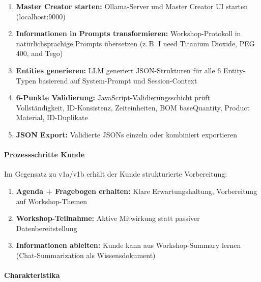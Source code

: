\begin{enumerate}
    \item \textbf{Master Creator starten:} Ollama-Server und Master Creator UI starten (localhost:9000)

    \item \textbf{Informationen in Prompts transformieren:} Workshop-Protokoll in natürlichsprachige Prompts übersetzen (z.\,B. \glqq I need Titanium Dioxide, PEG 400, and Tego\grqq{})

    \item \textbf{Entities generieren:} LLM generiert JSON-Strukturen für alle 6 Entity-Typen basierend auf System-Prompt und Session-Context

    \item \textbf{6-Punkte Validierung:} JavaScript-Validierungsschicht prüft Vollständigkeit, ID-Konsistenz, Zeiteinheiten, BOM baseQuantity, Product Material, ID-Duplikate

    \item \textbf{JSON Export:} Validierte JSONs einzeln oder kombiniert exportieren
\end{enumerate}

\paragraph{Prozessschritte Kunde}

Im Gegensatz zu v1a/v1b erhält der Kunde strukturierte Vorbereitung:

\begin{enumerate}
    \item \textbf{Agenda + Fragebogen erhalten:} Klare Erwartungshaltung, Vorbereitung auf Workshop-Themen

    \item \textbf{Workshop-Teilnahme:} Aktive Mitwirkung statt passiver Datenbereitstellung

    \item \textbf{Informationen ableiten:} Kunde kann aus Workshop-Summary lernen (Chat-Summarization als Wissensdokument)
\end{enumerate}

\paragraph{Charakteristika}

